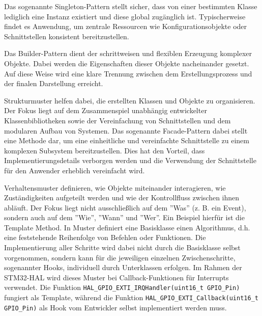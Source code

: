 Das sogenannte Singleton-Pattern stellt sicher, dass von einer bestimmten Klasse lediglich eine Instanz existiert und diese global zugänglich ist. 
Typischerweise findet es Anwendung, um zentrale Ressourcen wie Konfigurationsobjekte oder Schnittstellen konsistent bereitzustellen.

Das Builder-Pattern dient der schrittweisen und flexiblen Erzeugung komplexer Objekte.
Dabei werden die Eigenschaften dieser Objekte nacheinander gesetzt. 
Auf diese Weise wird eine klare Trennung zwischen dem Erstellungsprozess und der finalen Darstellung erreicht.

Strukturmuster helfen dabei, die erstellten Klassen und Objekte zu organisieren.
Der Fokus liegt auf dem Zusammenspiel unabhängig entwickelter Klassenbibliotheken sowie der Vereinfachung von Schnittstellen und dem modularen Aufbau von Systemen.
Das sogenannte Facade-Pattern dabei stellt eine Methode dar, um eine einheitliche und vereinfachte Schnittstelle zu einem komplexen Subsystem bereitzustellen. 
Dies hat den Vorteil, dass Implementierungsdetails verborgen werden und die Verwendung der Schnittstelle für den Anwender erheblich vereinfacht wird.

Verhaltensmuster definieren, wie Objekte miteinander interagieren, wie Zuständigkeiten aufgeteilt werden und wie der Kontrollfluss zwischen ihnen abläuft.
Der Fokus liegt nicht ausschließlich auf dem ''Was'' (z. B. ein Event), sondern auch auf dem ''Wie'', ''Wann'' und ''Wer''.
Ein Beispiel hierfür ist die Template Method. 
In Muster definiert eine Basisklasse einen Algorithmus, d.h. eine feststehende Reihenfolge von Befehlen oder Funktionen. 
Die Implementierung aller Schritte wird dabei nicht durch die Basisklasse selbst vorgenommen, sondern kann für die jeweiligen einzelnen Zwischenschritte, sogenannter Hooks, individuell durch Unterklassen erfolgen.
Im Rahmen der STM32-HAL wird dieses Muster bei Callback-Funktionen für Interrupts verwendet. 
Die Funktion \texttt{HAL\_GPIO\_EXTI\_IRQHandler(uint16\_t GPIO\_Pin)} fungiert als Template, während die Funktion \texttt{HAL\_GPIO\_EXTI\_Callback(uint16\_t GPIO\_Pin)} als Hook vom Entwickler selbst implementiert werden muss.

